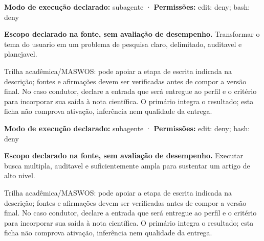 \begin{arquitetura}
\textbf{Modo de execução declarado:} subagente · \textbf{Permissões:} edit: deny; bash: deny
\end{arquitetura}


\begin{descricao}
\textbf{Escopo declarado na fonte, sem avaliação de desempenho.}
Transformar o tema do usuario em um problema de pesquisa claro, delimitado, auditavel e planejavel.
\end{descricao}

\begin{funcao}
Trilha acadêmica/MASWOS: pode apoiar a etapa de escrita indicada na descrição; fontes e afirmações devem ser verificadas antes de compor a versão final. No caso condutor, declare a entrada que será entregue ao perfil e o critério para incorporar sua saída à nota científica. O primário integra o resultado; esta ficha não comprova ativação, inferência nem qualidade da entrega.
\end{funcao}

\begin{arquitetura}
\textbf{Modo de execução declarado:} subagente · \textbf{Permissões:} edit: deny; bash: deny
\end{arquitetura}


\begin{descricao}
\textbf{Escopo declarado na fonte, sem avaliação de desempenho.}
Executar busca multipla, auditavel e suficientemente ampla para sustentar um artigo de alto nivel.
\end{descricao}

\begin{funcao}
Trilha acadêmica/MASWOS: pode apoiar a etapa de escrita indicada na descrição; fontes e afirmações devem ser verificadas antes de compor a versão final. No caso condutor, declare a entrada que será entregue ao perfil e o critério para incorporar sua saída à nota científica. O primário integra o resultado; esta ficha não comprova ativação, inferência nem qualidade da entrega.
\end{funcao}

